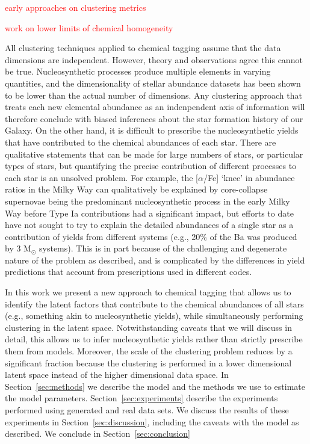 \documentclass[twocolumn]{aastex61}
\newcommand{\todo}[1]{\textcolor{red}{#1}}
\begin{document}
\todo{early approaches on clustering metrics}

\todo{work on lower limits of chemical homogeneity}


All clustering techniques applied to chemical tagging assume that the data
dimensions are independent. However, theory and observations agree this cannot
be true. Nucleosynthetic processes produce multiple elements in varying
quantities, and the dimensionality of stellar abundance datasets has been shown
to be lower than the actual number of dimensions. Any clustering approach that
treats each new elemental abundance as an indenpendent axis of information will
therefore conclude with biased inferences about the star formation history of
our Galaxy. On the other hand, it is difficult to prescribe the nucleosynthetic
yields that have contributed to the chemical abundances of each star. There are
qualitative statements that can be made for large numbers of stars, or particular
types of stars, but quantifying the precise contribution of different processes
to each star is an unsolved problem. For example, the [$\alpha$/Fe] `knee' in
abundance ratios in the Milky Way can qualitatively be explained by 
core-collapse supernovae being the predominant nucleosynthetic process in the
early Milky Way before Type Ia contributions had a significant impact, but 
efforts to date have not sought to try to explain the detailed abundances of a 
single star as a contribution of yields from different systems (e.g., 20\% of the
Ba was produced by 3 M$_\odot$ systems). This is in part because of the
challenging and degenerate nature of the problem as described, and is complicated
by the differences in yield predictions that account from prescriptions used in
different codes.


In this work we present a new approach to chemical tagging that allows us to 
identify the latent factors that contribute to the chemical abundances of all 
stars (e.g., something akin to nucleosynthetic yields), while simultaneously
performing clustering in the latent space. Notwithstanding caveats that we will
discuss in detail, this allows us to infer nucleosynthetic yields rather than
strictly prescribe them from models. Moreover, the scale of the clustering
problem reduces by a significant fraction because the clustering is performed in
a lower dimensional latent space instead of the higher dimensional data space.
In Section~\ref{sec:methods} we describe the model and the methods we use to
estimate the model parameters. Section~\ref{sec:experiments} describe the 
experiments performed using generated and real data sets. We discuss the results
of these experiments in Section~\ref{sec:discussion}, including the caveats with
the model as described. We conclude in Section~\ref{sec:conclusion}
\end{document}
